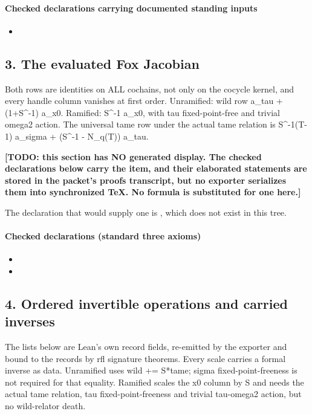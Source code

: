 \paragraph{Checked declarations carrying documented standing inputs}
\begin{itemize}
\item {}
\end{itemize}

\subsection*{3. The evaluated Fox Jacobian}
Both rows are identities on ALL cochains, not only on the cocycle kernel, and every handle column vanishes at first order. Unramified: wild row a\_tau + (1+S\textasciicircum{}-1) a\_x0. Ramified: S\textasciicircum{}-1 a\_x0, with tau fixed-point-free and trivial omega2 action. The universal tame row under the actual tame relation is S\textasciicircum{}-1(T-1) a\_sigma + (S\textasciicircum{}-1 - N\_q(T)) a\_tau.

\par\noindent\textbf{[TODO: this section has NO generated display. The checked declarations below carry the item, and their elaborated statements are stored in the packet's proofs transcript, but no exporter serializes them into synchronized TeX. No formula is substituted for one here.]}
\par\noindent The declaration that would supply one is , which does not exist in this tree.
\paragraph{Checked declarations (standard three axioms)}
\begin{itemize}
\item {}
\item {}
\end{itemize}

\subsection*{4. Ordered invertible operations and carried inverses}
The lists below are Lean's own record fields, re-emitted by the exporter and bound to the records by rfl signature theorems. Every scale carries a formal inverse as data. Unramified uses wild += S*tame; sigma fixed-point-freeness is not required for that equality. Ramified scales the x0 column by S and needs the actual tame relation, tau fixed-point-freeness and trivial tau-omega2 action, but no wild-relator death.

